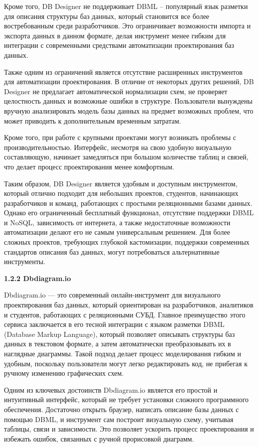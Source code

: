 Кроме того, DB Designer не поддерживает DBML – популярный язык разметки для описания структуры баз данных, который становится все более востребованным среди разработчиков. Это ограничивает возможности импорта и экспорта данных в данном формате, делая инструмент менее гибким для интеграции с современными средствами автоматизации проектирования баз данных.

Также одним из ограничений является отсутствие расширенных инструментов для автоматизации проектирования. В отличие от некоторых других решений, DB Designer не предлагает автоматической нормализации схем, не проверяет целостность данных и возможные ошибки в структуре. Пользователи вынуждены вручную анализировать модель базы данных на предмет возможных проблем, что может приводить к дополнительным временным затратам.

Кроме того, при работе с крупными проектами могут возникать проблемы с производительностью. Интерфейс, несмотря на свою удобную визуальную составляющую, начинает замедляться при большом количестве таблиц и связей, что делает процесс проектирования менее комфортным.

Таким образом, DB Designer является удобным и доступным инструментом, который отлично подходит для небольших проектов, студентов, начинающих разработчиков и команд, работающих с простыми реляционными базами данных. Однако его ограниченный бесплатный функционал, отсутствие поддержки DBML и NoSQL, зависимость от интернета, а также недостаточные возможности автоматизации делают его не самым универсальным решением. Для более сложных проектов, требующих глубокой кастомизации, поддержки современных стандартов описания баз данных, могут потребоваться альтернативные инструменты.

\textbf{1.2.2 Dbdiagram.io }

Dbdiagram.io — это современный онлайн-инструмент для визуального проектирования баз данных, который ориентирован на разработчиков, аналитиков и студентов, работающих с реляционными СУБД. Главное преимущество этого сервиса заключается в его тесной интеграции с языком разметки DBML (Database Markup Language), который позволяет описывать структуры баз данных в текстовом формате, а затем автоматически преобразовывать их в наглядные диаграммы. Такой подход делает процесс моделирования гибким и удобным, поскольку пользователи могут легко редактировать код, не прибегая к ручному изменению графических схем.

Одним из ключевых достоинств Dbdiagram.io является его простой и интуитивный интерфейс, который не требует установки сложного программного обеспечения. Достаточно открыть браузер, написать описание базы данных с помощью DBML, и инструмент сам построит визуальную схему, учитывая таблицы, связи и зависимости. Это позволяет ускорить процесс проектирования и избежать ошибок, связанных с ручной прорисовкой диаграмм.

